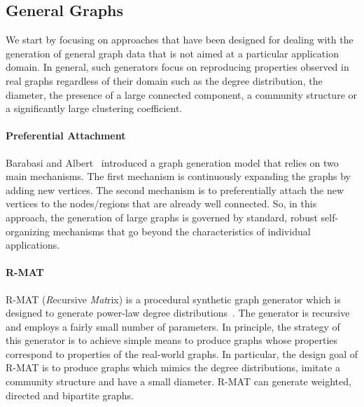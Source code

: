 \subsection{General Graphs}
\label{sec:generators_general}

We start by focusing on approaches that have been designed for dealing with the
generation of general graph data that is not aimed at a particular application
domain. In general, such generators focus on reproducing properties observed in
real graphs regardless of their domain such as the degree distribution, the
diameter, the presence of a large connected component, a community structure or
a significantly large clustering coefficient.



\paragraph {Preferential Attachment} Barabasi and
Albert~\cite{Barabasi99emergenceScaling} introduced a graph generation model
that relies on two main mechanisms. The first mechanism is continuously
expanding the graphs by adding new vertices. The second mechanism is to
preferentially attach the new vertices   to the nodes/regions that are already
well connected. So, in this approach, the generation of large graphs is governed
by standard, robust self-organizing mechanisms that go beyond the
characteristics of individual applications.

\paragraph {R-MAT} R-MAT (\emph{R}ecursive \emph{Mat}rix) is a procedural
synthetic graph generator which is designed to generate power-law degree
distributions~\cite{DBLP:conf/sdm/ChakrabartiZF04}.  The generator is recursive
and employs a fairly small number of parameters.  In principle, the strategy of
this generator is to achieve simple means to produce graphs whose properties correspond to 
properties of the real-world graphs. In particular, the design goal of R-MAT is to
produce graphs which mimics the degree distributions, imitate a community
structure and have a small diameter. R-MAT can generate weighted, directed and
bipartite graphs.


